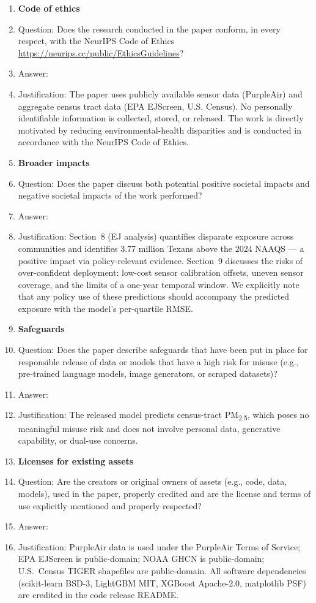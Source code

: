 \begin{enumerate}
\item {\bf Code of ethics}
    \item[] Question: Does the research conducted in the paper conform, in every respect, with the NeurIPS Code of Ethics \url{https://neurips.cc/public/EthicsGuidelines}?
    \item[] Answer: \answerYes{}
    \item[] Justification: The paper uses publicly available sensor data (PurpleAir) and aggregate census tract data (EPA EJScreen, U.S. Census). No personally identifiable information is collected, stored, or released. The work is directly motivated by reducing environmental-health disparities and is conducted in accordance with the NeurIPS Code of Ethics.

\item {\bf Broader impacts}
    \item[] Question: Does the paper discuss both potential positive societal impacts and negative societal impacts of the work performed?
    \item[] Answer: \answerYes{}
    \item[] Justification: Section~8 (EJ analysis) quantifies disparate exposure across communities and identifies \num{3.77} million Texans above the 2024 NAAQS --- a positive impact via policy-relevant evidence. Section~9 discusses the risks of over-confident deployment: low-cost sensor calibration offsets, uneven sensor coverage, and the limits of a one-year temporal window. We explicitly note that any policy use of these predictions should accompany the predicted exposure with the model's per-quartile RMSE.

\item {\bf Safeguards}
    \item[] Question: Does the paper describe safeguards that have been put in place for responsible release of data or models that have a high risk for misuse (e.g., pre-trained language models, image generators, or scraped datasets)?
    \item[] Answer: \answerNA{}
    \item[] Justification: The released model predicts census-tract PM\textsubscript{2.5}, which poses no meaningful misuse risk and does not involve personal data, generative capability, or dual-use concerns.

\item {\bf Licenses for existing assets}
    \item[] Question: Are the creators or original owners of assets (e.g., code, data, models), used in the paper, properly credited and are the license and terms of use explicitly mentioned and properly respected?
    \item[] Answer: \answerYes{}
    \item[] Justification: PurpleAir data is used under the PurpleAir Terms of Service; EPA EJScreen is public-domain; NOAA GHCN is public-domain; U.S.\ Census TIGER shapefiles are public-domain. All software dependencies (scikit-learn BSD-3, LightGBM MIT, XGBoost Apache-2.0, matplotlib PSF) are credited in the code release README.


\end{enumerate}
